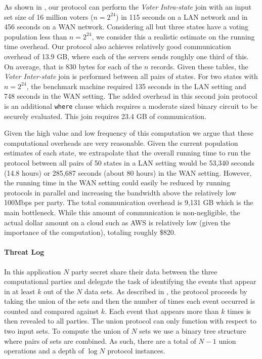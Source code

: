 As shown in , our  protocol can perform the \emph{Voter Intra-state} join with an input set size of 16 million voters ($n=2^{24}$) in 115 seconds on a LAN network and in 456 seconds on a WAN network. Considering all but three states have a voting population less than $n=2^{24}$, we consider this a realistic estimate on the running time overhead. Our protocol also achieves relatively good communication overhead of 13.9 GB, where each of the servers sends roughly one third of this. On average, that is 830 bytes for each of the $n$ records. Given these tables, the \emph{Voter Inter-state} join is performed between all pairs of states. For two states with $n=2^{24}$, the benchmark machine required 135 seconds in the LAN setting and 748 seconds in the WAN setting. The added overhead in this second join protocol is an additional \texttt{where} clause which requires a moderate sized binary circuit to be securely evaluated. This join requires 23.4 GB of communication.

Given the high value and low frequency of this computation we argue that these computational overheads are very reasonable. Given the current population estimates of each state, we extrapolate that the overall running time to run the protocol between all pairs of 50 states in a LAN setting would be 53,340 seconds (14.8 hours) or  285,687 seconds (about 80 hours) in the WAN setting. However, the running time in the WAN setting could easily be reduced by running protocols in parallel and increasing the bandwidth above the relatively low 100Mbps per party. The total communication overhead is 9,131 GB which is the main bottleneck.  While this amount of communication is non-negligible, the actual dollar amount on a cloud such as AWS\cite{aws} is relatively low (given the importance of the computation), totaling roughly \$820\cite{aws_pricing}. 


\paragraph{Threat Log} In this application $N$ party secret share their data between the three computational parties and delegate the task of identifying the events that appear in at least $k$ out of the $N$ data sets. As described in , the protocol proceeds by taking the union of the sets and then the number of times each event occurred is counted and compared against $k$. Each event that appears more than $k$ times is then revealed to all parties. The union protocol can only function with respect to two input sets. To compute the union of $N$ sets we use a binary tree structure where pairs of sets are combined. As such, there are a total of $N-1$ union operations and a depth of $\log N$ protocol instances.

